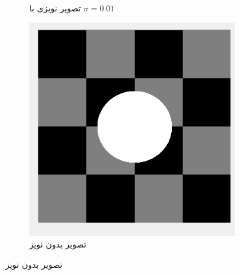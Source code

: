 \documentclass[11.5pt,a4paper]{article}
\begin{document}
\begin{figure}[h]
\begin{subfigure}{0.3\textwidth}
	\caption{تصویر نویزی با $\sigma=0.01$}
	\end{subfigure}	
	\begin{subfigure}{0.3\textwidth}
	\includegraphics[scale=0.3]{Imgs/MRF_S0_In.png}
	\caption{تصویر بدون نویز}
	\end{subfigure}	


\end{figure}
\end{document}

